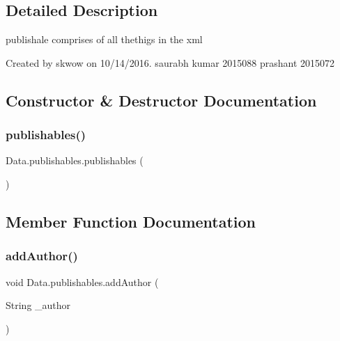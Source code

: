 \subsection{Detailed Description}
publishale comprises of all thethigs in the xml 

Created by skwow on 10/14/2016. saurabh kumar 2015088 prashant 2015072 

\subsection{Constructor \& Destructor Documentation}
\hypertarget{class_data_1_1publishables_aceabba690b9f11b724b7ca0bb1bd6ed9}{}\label{class_data_1_1publishables_aceabba690b9f11b724b7ca0bb1bd6ed9} 
\subsubsection{\texorpdfstring{publishables()}{publishables()}}
{\footnotesize\ttfamily Data.\+publishables.\+publishables (\begin{DoxyParamCaption}{ }\end{DoxyParamCaption})}



\subsection{Member Function Documentation}
\hypertarget{class_data_1_1publishables_afefb90428e6d1ce4f699b4a4a10da4fa}{}\label{class_data_1_1publishables_afefb90428e6d1ce4f699b4a4a10da4fa} 
\subsubsection{\texorpdfstring{add\+Author()}{addAuthor()}}
{\footnotesize\ttfamily void Data.\+publishables.\+add\+Author (\begin{DoxyParamCaption}\item[{String}]{\+\_\+author }\end{DoxyParamCaption})}

\hypertarget{class_data_1_1publishables_a1ab3287a7eada2b725f7e1d735d235fa}{}\label{class_data_1_1publishables_a1ab3287a7eada2b725f7e1d735d235fa} 
